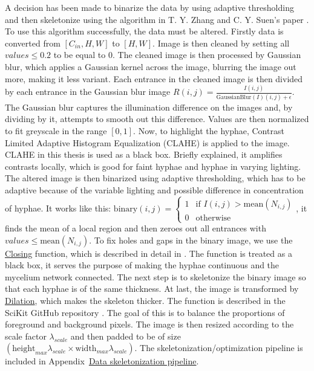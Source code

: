 \documentclass[a4paper,12pt]{article}
\begin{document}
A decision has been made to binarize the data by using adaptive thresholding and then skeletonize using the algorithm in T. Y. Zhang and C. Y. Suen's paper \cite{10.1145/357994.358023}. To use this algorithm successfully, the data must be altered. Firstly data is converted from $[C_{in}, H, W]$ to $[H, W]$. Image is then cleaned by setting all $values \leq 0.2$ to be equal to $0$. The cleaned image is then processed by Gaussian blur, which applies a Gaussian kernel across the image, blurring the image out more, making it less variant. Each entrance in the cleaned image is then divided by each entrance in the Gaussian blur image $R(i, j) = \frac{I(i, j)}{\text{GaussianBlur}(I)(i, j) + \epsilon}$.
The Gaussian blur captures the illumination difference on the images and, by dividing by it, attempts to smooth out this difference. Values are then normalized to fit greyscale in the range $[0, 1]$. Now, to highlight the hyphae, Contrast Limited Adaptive Histogram Equalization (CLAHE) is applied to the image. CLAHE in this thesis is used as a black box. Briefly explained, it amplifies contrasts locally, which is good for faint hyphae and hyphae in varying lighting. The altered image is then binarized using adaptive thresholding, which has to be adaptive because of the variable lighting and possible difference in concentration of hyphae. It works like this: $\text{binary}(i,j) =
\begin{cases}
1 & \text{if } I(i,j) > \text{mean}(N_{i,j}) \\
0 & \text{otherwise}
\end{cases}$, it finds the mean of a local region and then zeroes out all entrances with $values \leq \text{mean}(N_{i,j})$. To fix holes and gaps in the binary image, we use the \href{https://github.com/scikit-image/scikit-image/blob/v0.25.2/skimage/morphology/gray.py#L443-L517}{Closing} function, which is described in detail in \cite{scikitimage2025gray}. The function is treated as a black box, it serves the purpose of making the hyphae continuous and the mycelium network connected. The next step is to skeletonize the binary image so that each hyphae is of the same thickness. At last, the image is transformed by \href{https://github.com/scikit-image/scikit-image/blob/v0.25.2/skimage/morphology/gray.py#L245-L363}{Dilation}, which makes the skeleton thicker. The function is described in the SciKit GitHub repository \cite{scikitimage2025gray_dilation}. The goal of this is to balance the proportions of foreground and background pixels.
The image is then resized according to the scale factor $\lambda_{scale}$ and then padded to be of size $(\text{height}_{max}\lambda_{scale} \times \text{width}_{max}\lambda_{scale})$. The skeletonization/optimization pipeline is included in Appendix~\hyperlink{sec:optim}{Data skeletonization pipeline}.
\end{document}
